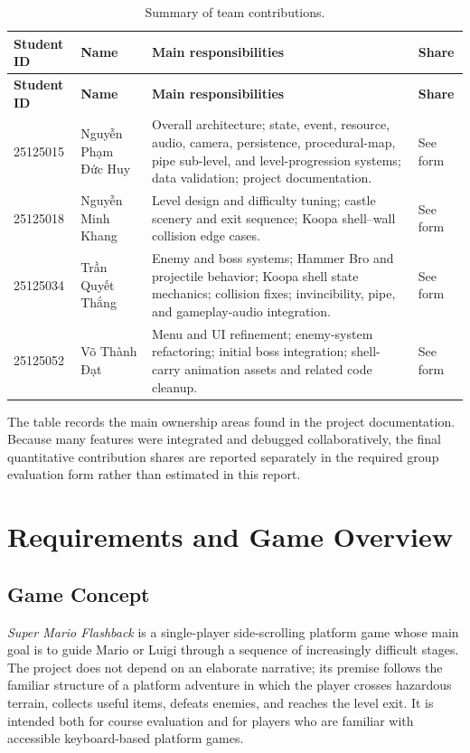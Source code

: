 \documentclass{template}
\newcommand{\VN}[1]{{\fontencoding{T5}\fontfamily{cmr}\selectfont #1}}
\begin{document}
\begin{longtable}{@{}p{2.2cm}p{3.4cm}p{7.5cm}p{1.8cm}@{}}
    \caption{Summary of team contributions.}\label{tab:contributions}\\
    \toprule
    \textbf{Student ID} & \textbf{Name} & \textbf{Main responsibilities} &
    \textbf{Share} \\
    \midrule
    \endfirsthead
    \toprule
    \textbf{Student ID} & \textbf{Name} & \textbf{Main responsibilities} &
    \textbf{Share} \\
    \midrule
    \endhead
    25125015 & \VN{Nguyễn Phạm Đức Huy} & Overall architecture; state, event,
    resource, audio, camera, persistence, procedural-map, pipe sub-level, and
    level-progression systems; data validation; project documentation. &
    See form \\
    25125018 & \VN{Nguyễn Minh Khang} & Level design and difficulty tuning;
    castle scenery and exit sequence; Koopa shell--wall collision edge cases. &
    See form \\
    25125034 & \VN{Trần Quyết Thắng} & Enemy and boss systems; Hammer Bro and
    projectile behavior; Koopa shell state mechanics; collision fixes;
    invincibility, pipe, and gameplay-audio integration. & See form \\
    25125052 & \VN{Võ Thành Đạt} & Menu and UI refinement; enemy-system
    refactoring; initial boss integration; shell-carry animation assets and
    related code cleanup. & See form \\
    \bottomrule
\end{longtable}

The table records the main ownership areas found in the project documentation.
Because many features were integrated and debugged collaboratively, the final
quantitative contribution shares are reported separately in the required group
evaluation form rather than estimated in this report.

\clearpage
\section{Requirements and Game Overview}

\subsection{Game Concept}

\textit{Super Mario Flashback} is a single-player side-scrolling platform game
whose main goal is to guide Mario or Luigi through a sequence of increasingly
difficult stages. The project does not depend on an elaborate narrative; its
premise follows the familiar structure of a platform adventure in which the
player crosses hazardous terrain, collects useful items, defeats enemies, and
reaches the level exit. It is intended both for course evaluation and for
players who are familiar with accessible keyboard-based platform games.
\end{document}
